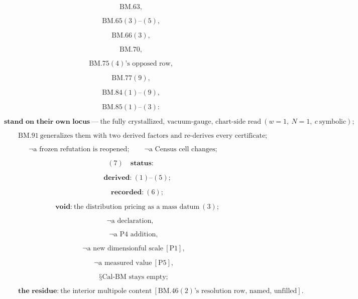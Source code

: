 \documentclass[11pt,openany]{report}
\theoremstyle{canonplain}
\theoremstyle{canondef}
\begin{document}
\[
\ \mathrm{BM.63},
\]

\[
\ \mathrm{BM.65}(3)\text{--}(5),
\]

\[
\ \mathrm{BM.66}(3),
\]

\[
\ \mathrm{BM.70},
\]

\[
\ \mathrm{BM.75}(4)\text{'s opposed row},
\]

\[
\ \mathrm{BM.77}(9),
\]

\[
\ \mathrm{BM.84}(1)\text{--}(9),
\]

\[
\ \mathrm{BM.85}(1)\text{--}(3):
\]

\[
\textbf{stand on their own locus}\ —\ \text{the fully crystallized, vacuum-gauge, chart-side read}\ (w{=}1,\ N{=}1,\ c\ \text{symbolic});
\]

\[
\qquad \mathrm{BM.91}\ \text{generalizes them with two derived factors and re-derives every certificate};
\]

\[
\neg\text{a frozen refutation is reopened};\qquad\neg\text{a Census cell changes};\qquad
\]

\[
(7)\quad\textbf{status:}
\]

\[
\qquad \textbf{derived:}\ (1)\text{--}(5);
\]

\[
\qquad \textbf{recorded:}\ (6);
\]

\[
\qquad \textbf{void:}\ \text{the distribution pricing as a mass datum}\ (3);
\]

\[
\neg\text{a declaration},
\]

\[
\quad\neg\text{a P4 addition},
\]

\[
\quad\neg\text{a new dimensionful scale}\ [\mathrm{P1}],
\]

\[
\quad\neg\text{a measured value}\ [\mathrm{P5}],
\]

\[
\quad\text{§Cal-BM stays empty};
\]

\[
\qquad \textbf{the residue:}\ \text{the interior multipole content}\ [\mathrm{BM.46}(2)\text{'s resolution row, named, unfilled}].
\]
\end{document}
